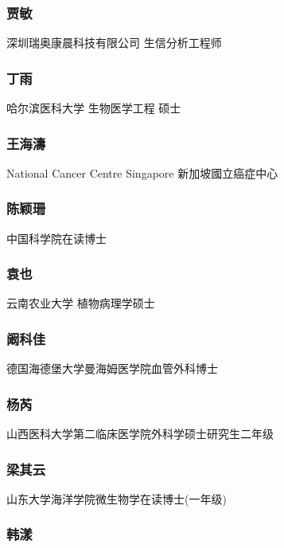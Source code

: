 \documentclass[]{article}
\begin{document}
\subsubsection{贾敏}

深圳瑞奥康晨科技有限公司 生信分析工程师

\subsubsection{丁雨}

哈尔滨医科大学 生物医学工程 硕士

\subsubsection{王海濤}

National Cancer Centre Singapore 新加坡國立癌症中心

\subsubsection{陈颖珊}

中国科学院在读博士

\subsubsection{袁也}

云南农业大学 植物病理学硕士

\subsubsection{阚科佳}

德国海德堡大学曼海姆医学院血管外科博士

\subsubsection{杨芮}

山西医科大学第二临床医学院外科学硕士研究生二年级

\subsubsection{梁其云}

山东大学海洋学院微生物学在读博士(一年级)

\subsubsection{韩漾}
\end{document}
